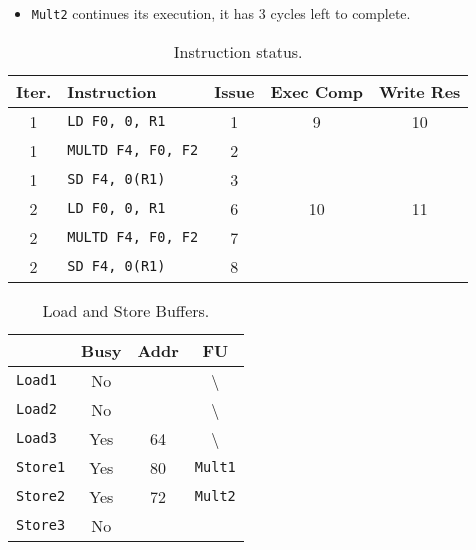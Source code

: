 \begin{enumerate}
\begin{itemize}
        \item \texttt{Mult2} continues its execution, it has 3 cycles left to complete.
    \end{itemize}
    \begin{table}[!htp]
        \centering
        \begin{tabular}{@{} c l | c c c @{}}
            \toprule
            Iter.       & Instruction                   & Issue & Exec Comp & Write Res \\
            \midrule
            1           & \texttt{LD    F0, 0, R1}      & 1     & 9         & 10        \\ [.3em]
            1           & \texttt{MULTD F4, F0, F2}     & 2     &           &           \\ [.3em]
            1           & \texttt{SD    F4, 0(R1)}      & 3     &           &           \\ [.3em]
            2           & \texttt{LD    F0, 0, R1}      & 6     & 10        & 11        \\ [.3em]
            2           & \texttt{MULTD F4, F0, F2}     & 7     &           &           \\ [.3em]
            2           & \texttt{SD    F4, 0(R1)}      & 8     &           &           \\
            \bottomrule
        \end{tabular}
        \caption*{Instruction status.}
    \end{table}

    \begin{table}[!htp]
        \centering
        \begin{tabular}{@{} l | c c c @{}}
            \toprule
                                & Busy      & Addr      & FU   \\
            \midrule
            \texttt{Load1}      & No        &           & \textbackslash        \\ [.3em]
            \texttt{Load2}      & No        &           & \textbackslash        \\ [.3em]
            \texttt{Load3}      & Yes       & 64        & \textbackslash        \\
            \cmidrule{1-4}
            \texttt{Store1}     & Yes       & 80        & \texttt{Mult1}        \\ [.3em]
            \texttt{Store2}     & Yes       & 72        & \texttt{Mult2}        \\ [.3em]
            \texttt{Store3}     & No        &           &                       \\
            \bottomrule
        \end{tabular}
        \caption*{Load and Store Buffers.}
    \end{table}


\end{enumerate}
